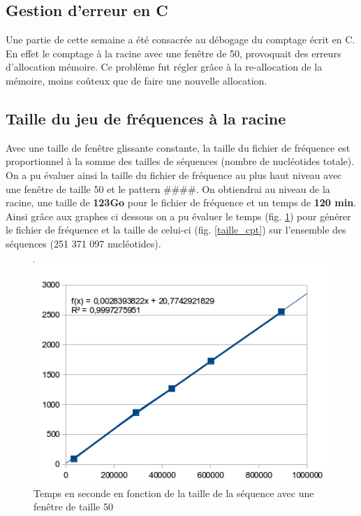 \subsection{Gestion d'erreur en C}
  Une partie de cette semaine a été consacrée au débogage du comptage écrit en C. En effet le comptage à la racine avec une fenêtre de 50, provoquait des erreurs 
  d'allocation mémoire. Ce problème fut régler grâce à la re-allocation de la mémoire, moins coûteux que de faire une nouvelle allocation. 
  \subsection{Taille du jeu de fréquences à la racine}
  Avec une taille de fenêtre glissante constante, la taille du fichier de fréquence est proportionnel à la somme des tailles de séquences (nombre de nucléotides totale). On a pu évaluer ainsi la taille du fichier de fréquence au plus haut niveau avec une fenêtre de taille 50 et le pattern \#\#\#\#. On obtiendrai au niveau de la racine, une taille de \textbf{123Go} pour le fichier de fréquence et un temps de \textbf{120 min}. Ainsi grâce aux graphes ci dessous on a pu évaluer le temps (fig. \ref{temps_cpt}) pour générer le fichier de fréquence et la taille de celui-ci (fig. \ref{taille_cpt}) sur l'ensemble des séquences (251 371 097 nucléotides).
  
  
\begin{figure}[H]
\begin{center}
\includegraphics[scale=0.6]{./../img/graphe_temps.png}
\caption[Temps de du comptage]{\label{temps_cpt}Temps en seconde en fonction de la taille de la séquence avec une fenêtre de taille 50}
\end{center}
\end{figure}

